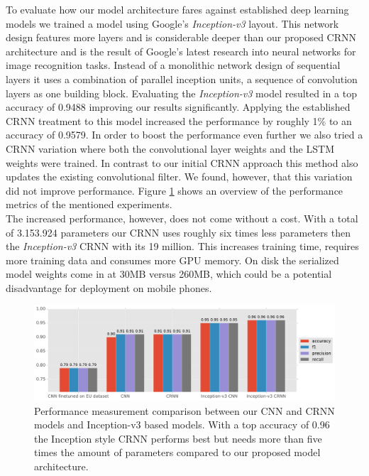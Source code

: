 To evaluate how our model architecture fares against established deep learning models we trained a model using Google's \emph{Inception-v3}\cite{szegedy2016rethinking} layout. This network design features more layers and is considerable deeper than our proposed CRNN architecture and is the result of Google's latest research into neural networks for image recognition tasks. Instead of a monolithic network design of sequential layers it uses a combination of parallel inception units, a sequence of convolution layers as one building block. Evaluating the \emph{Inception-v3} model resulted in a top accuracy of 0.9488 improving our results significantly. Applying the established CRNN treatment to this model increased the performance by roughly 1\% to an accuracy of 0.9579. In order to boost the performance even further we also tried a CRNN variation where both the convolutional layer weights and the LSTM weights were trained. In contrast to our initial CRNN approach this method also updates the existing convolutional filter. We found, however, that this variation did not improve performance. Figure \ref{fig:news_results} shows an overview of the performance metrics of the mentioned experiments.\\
The increased performance, however, does not come without a cost. With a total of 3.153.924 parameters our CRNN uses roughly six times less parameters then the \emph{Inception-v3} CRNN with its 19 million. This increases training time, requires more training data and consumes more GPU memory. On disk the serialized model weights come in at 30MB versus 260MB, which could be a potential disadvantage for deployment on mobile phones.

	\begin{figure}[]
  		\centering
    	\includegraphics[width=\textwidth, keepaspectratio]{plots/results_news_plot.pdf}
    	\caption{Performance measurement comparison between our CNN and CRNN models and Inception-v3 based models. With a top accuracy of 0.96 the Inception style CRNN performs best but needs more than five times the amount of parameters compared to our proposed model architecture.}
    	\label{fig:news_results}
	\end{figure}


